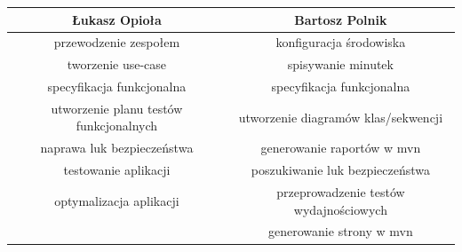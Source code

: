 \documentclass[a4paper,11pt]{article}
\begin{document}
\begin{tabular}{ c | c }
  Łukasz Opioła & Bartosz Polnik \\ \hline
  przewodzenie zespołem & konfiguracja środowiska \\
  tworzenie use-case & spisywanie minutek \\
  specyfikacja funkcjonalna & specyfikacja funkcjonalna \\
  utworzenie planu testów funkcjonalnych & utworzenie diagramów klas/sekwencji \\
  naprawa luk bezpieczeństwa & generowanie raportów w mvn \\
  testowanie aplikacji & poszukiwanie luk bezpieczeństwa \\
  optymalizacja aplikacji & przeprowadzenie testów wydajnościowych \\
   & generowanie strony w mvn
\end{tabular}
\end{document}
